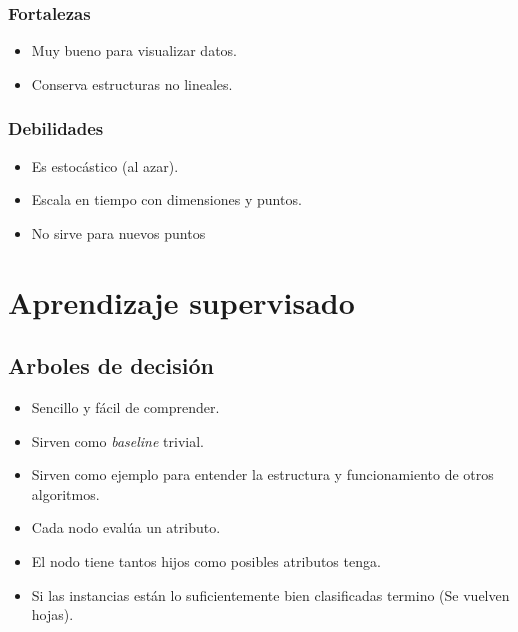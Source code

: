 \documentclass[titlepage,a4paper]{article}
\begin{document}
\subsubsection*{Fortalezas}
\begin{itemize}
    \item Muy bueno para visualizar datos.
    \item Conserva estructuras no lineales.
\end{itemize}

\subsubsection*{Debilidades}
\begin{itemize}
    \item Es estocástico (al azar).
    \item Escala en tiempo con dimensiones y puntos.
    \item No sirve para nuevos puntos
\end{itemize}

\newpage

\section{Aprendizaje supervisado}
\subsection{Arboles de decisión}
\begin{itemize}
    \item Sencillo y fácil de comprender.
    \item Sirven como \textit{baseline} trivial.
    \item Sirven como ejemplo para entender la estructura y funcionamiento de otros algoritmos.
    \item Cada nodo evalúa un atributo.
    \item El nodo tiene tantos hijos como posibles atributos tenga.
    \item Si las instancias están lo suficientemente bien clasificadas termino (Se vuelven hojas).
\end{itemize}
\end{document}
